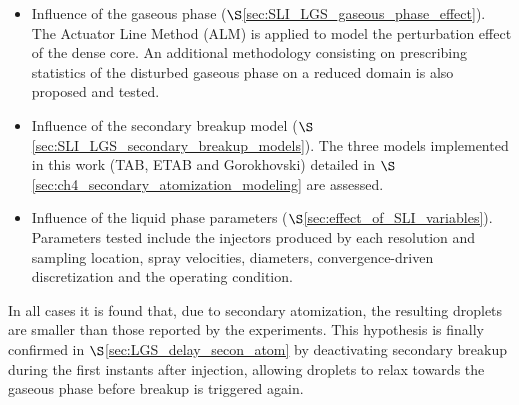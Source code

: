 \begin{itemize}

	\item Influence of the gaseous phase ($\S$\ref{sec:SLI_LGS_gaseous_phase_effect}). The Actuator Line Method (ALM) is applied to model the perturbation effect of the dense core. An additional methodology consisting on prescribing statistics of the disturbed gaseous phase on a reduced domain is also proposed and tested. %
	
	
	\vspace*{-0.05in}
	
	\item Influence of the secondary breakup model ($\S$\ref{sec:SLI_LGS_secondary_breakup_models}). The three models implemented in this work (TAB, ETAB and Gorokhovski) detailed in $\S$\ref{sec:ch4_secondary_atomization_modeling} are assessed. %
	
	
	
	\vspace*{-0.05in}
	
	\item Influence of the liquid phase parameters ($\S$\ref{sec:effect_of_SLI_variables}). Parameters tested include the injectors produced by each resolution and sampling location, spray velocities, diameters, convergence-driven discretization and the operating condition. %

\end{itemize}

In all cases it is found that, due to secondary atomization, the resulting droplets are smaller than those reported by the experiments. This hypothesis is finally confirmed in $\S$\ref{sec:LGS_delay_secon_atom} by deactivating secondary breakup during the first instants after injection, allowing droplets to relax towards the gaseous phase before breakup is triggered again. 





